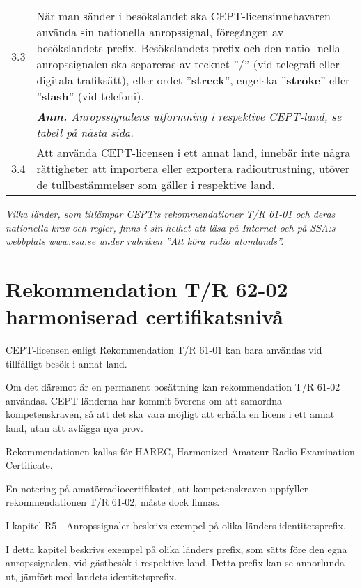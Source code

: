 \begin{tabularx}{\columnwidth}{lX}
3.3 & När man sänder i besökslandet ska
CEPT-licensinnehavaren använda sin
nationella anropssignal, föregången av
besökslandets prefix.
Besökslandets prefix och den natio-
nella anropssignalen ska separeras av
tecknet ''/'' (vid telegrafi eller digitala
trafiksätt), eller ordet ”\textbf{streck}”,
engelska ”\textbf{stroke}” eller ”\textbf{slash}” (vid
telefoni).\vspace{1ex}\\

& \emph{\textbf{Anm.} Anropssignalens utformning
i respektive CEPT-land, se tabell på
nästa sida.}\vspace{1ex}\\

3.4 & Att använda CEPT-licensen i ett annat
land, innebär inte några rättigheter att
importera eller exportera radioutrustning, 
utöver de tullbestämmelser som
gäller i respektive land.\vspace{1ex}\\
\end{tabularx}

\emph{Vilka länder, som tillämpar CEPT:s
	rekommendationer T/R 61-01 och deras
	nationella krav och regler, finns i sin
	helhet att läsa på Internet och på SSA:s
	webbplats www.ssa.se under rubriken
	”Att köra radio utomlands”.}

\section{Rekommendation T/R 62-02 harmoniserad certifikatsnivå}

CEPT-licensen enligt Rekommendation
T/R 61-01 kan bara användas vid tillfälligt
besök i annat land.

Om det däremot är en permanent bosättning
kan rekommendation T/R 61-02 användas.
CEPT-länderna har kommit överens om att
samordna kompetenskraven, så att det ska
vara möjligt att erhålla en licens i ett annat
land, utan att avlägga nya prov.

Rekommendationen kallas för HAREC,
Harmonized Amateur Radio Examination
Certificate.

En notering på amatörradiocertifikatet,
att kompetenskraven uppfyller rekommendationen 
T/R 61-02, måste dock finnas.

I kapitel R5 - Anropssignaler 
beskrivs exempel på olika länders
identitetsprefix.

I detta kapitel beskrivs exempel på olika
länders prefix, som sätts före den egna
anropssignalen, vid gästbesök i respektive 
land. Detta prefix kan se annorlunda
ut, jämfört med landets identitetsprefix.

